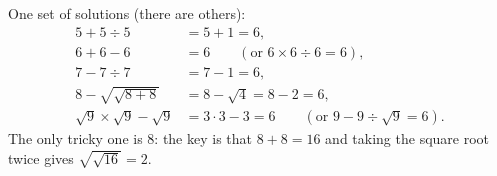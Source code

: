 One set of solutions (there are others):
\begin{align*}
5+5\div5&=5+1=6,\\
6+6-6&=6\qquad(\text{or } 6\times6\div6=6),\\
7-7\div7&=7-1=6,\\
8-\sqrt{\sqrt{8+8}}&=8-\sqrt{4}=8-2=6,\\
\sqrt9\times\sqrt9-\sqrt9&=3\cdot3-3=6\qquad(\text{or } 9-9\div\sqrt9=6).
\end{align*}
The only tricky one is $8$: the key is that $8+8=16$ and taking the square root twice gives $\sqrt{\sqrt{16}}=2$.
